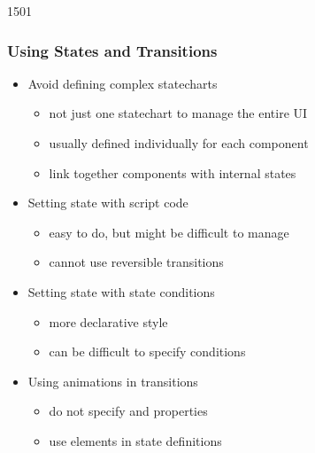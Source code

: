 \begin{slide}{1501}\frametitle{Using States and Transitions}

\begin{itemize}
\item Avoid defining complex statecharts
  \begin{itemize}
  \item not just one statechart to manage the entire UI
  \item usually defined individually for each component
  \item link together components with internal states
  \end{itemize}
\item Setting state with script code
  \begin{itemize}
  \item easy to do, but might be difficult to manage
  \item cannot use reversible transitions
  \end{itemize}
\item Setting state with state conditions
  \begin{itemize}
  \item more declarative style
  \item can be difficult to specify conditions
  \end{itemize}
\item Using animations in transitions
  \begin{itemize}
  \item do not specify  and  properties
  \item use  elements in state definitions
  \end{itemize}
\end{itemize}


\end{slide}


